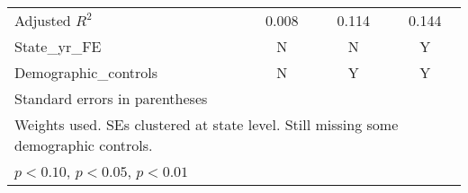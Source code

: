 \begin{table}[htbp]
\begin{tabular}{l*{3}{c}}
Adjusted \(R^{2}\)  &       0.008         &       0.114         &       0.144         \\
State\_yr\_FE         &           N         &           N         &           Y         \\
Demographic\_controls&           N         &           Y         &           Y         \\
\hline\hline
\multicolumn{4}{l}{\footnotesize Standard errors in parentheses}\\
\multicolumn{4}{l}{\footnotesize Weights used. SEs clustered at state level. Still missing some demographic controls.}\\
\multicolumn{4}{l}{\footnotesize \sym{*} \(p<0.10\), \sym{**} \(p<0.05\), \sym{***} \(p<0.01\)}\\
\end{tabular}
\end{table}
